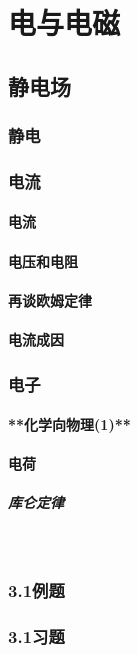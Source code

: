 \chapter{电与电磁} 
\section{静电场}
\subsection{静电}
\subsection{电流}
\subsubsection{电流}
\subsubsection{电压和电阻}
\subsubsection{再谈欧姆定律}
\subsubsection{电流成因}
\subsection{电子}
\subsubsection{**化学向物理(1)**}
\subsubsection{电荷}
\paragraph{库仑定律}\ \ \ \ 
\subsection{3.1例题}
\subsection{3.1习题}